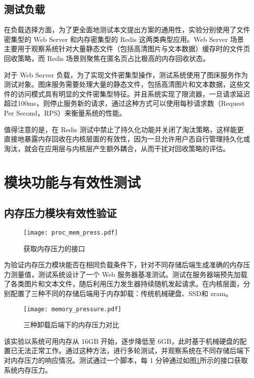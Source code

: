 \subsection{测试负载}

在负载选择方面，为了更全面地测试本文提出方案的通用性，实验分别使用了文件密集型的 Web Server 和内存密集型的 Redis 这两类典型应用。Web Server 场景主要用于观察系统针对大量静态文件（包括高清图片与文本数据）缓存时的文件页回收策略，而 Redis 场景则聚焦在匿名页占比极高的内存回收状态。

对于 Web Server 负载，为了实现文件密集型操作，测试系统使用了图床服务作为测试对象。图床服务需要处理大量的静态文件，包括高清图片和文本数据，这些文件的访问模式具有明显的文件密集型特征。并且系统实现了限流器，一旦请求延迟超过100ms，则停止服务新的请求，通过这种方式可以使用每秒请求数（Request Per Second，RPS）来衡量系统的性能。

值得注意的是，在 Redis 测试中禁止了持久化功能并关闭了淘汰策略，这样能更直接地暴露内存回收在内核层面的有效性，因为一旦允许用户态自行管理持久化或淘汰，就会在应用层与内核层产生额外耦合，从而干扰对回收策略的评估。



\section{模块功能与有效性测试}

\subsection{内存压力模块有效性验证}


\begin{figure}[htb]
    \centering
    \texttt{[image: proc\_mem\_press.pdf]}
    \caption{获取内存压力的接口}
    \label{fig:proc_mem_press}
\end{figure}

为验证内存压力模块能否在相同负载条件下，针对不同存储后端生成准确的内存压力测量值，测试系统设计了一个 Web 服务器基准测试。测试在服务器端预先加载了各类图片和文本文件，随后利用压力发生器持续随机发起请求。在内核层面，分别配置了三种不同的存储后端用于内存卸载：传统机械硬盘、SSD和 zram。

\begin{figure}[htb]
    \centering
    \texttt{[image: memory\_pressure.pdf]}
    \caption{三种卸载后端下的内存压力对比}
    \label{fig:memory_pressure}
\end{figure}
该实验以系统可用内存从 16GB 开始，逐步降低至 6GB，此时基于机械硬盘的配置已无法正常工作。通过这种方法，进行多轮测试，并观察系统在不同存储后端下对内存压力的响应情况。测试通过一个脚本，每 1 分钟通过如图\ref{fig:proc_mem_press}所示的接口获取系统内存压力。

